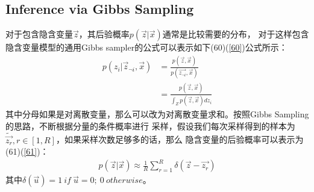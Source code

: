 \documentclass[UTF8]{ctexart}
\begin{document}
\subsection{Inference via Gibbs Sampling}
对于包含隐含变量$\vec{z}$，其后验概率$p(\vec{z}|\vec{x})$通常是比较需要的分布，
对于这样包含隐含变量模型的通用Gibbs sampler的公式可以表示如下(60)(\ref{60})公式所示：
\begin{align}
\label{60}
p(z_i|\vec{z}_{\neg i}, \vec{x}) &= \frac{p(\vec{z}, \vec{x})}{p(\vec{z_{\neg i}}, \vec{x})}
\\
&= \frac{p(\vec{z},\vec{x})}{\int_{Z}p(\vec{z}, \vec{x})dz_i}
\end{align}
其中分母如果是对离散变量，那么可以改为对离散变量求和。按照Gibbs Sampling的思路，不断根据分量的条件概率进行
采样，假设我们每次采样得到的样本为$\tilde{\vec{z_r}}, r \in [1, R]$，如果采样次数足够多的话，那么
隐含变量的后验概率可以表示为(61)(\ref{61})：
\begin{align}
\label{61}
p(\vec{z}|\vec{x}) \approx \frac{1}{R}\sum_{r=1}^R \delta(\vec{z} - \vec{z_r})
\end{align}
其中$\delta(\vec{u}) = {1 \ if \ \vec{u}=0;\  0 \  otherwise}$。
\end{document}
